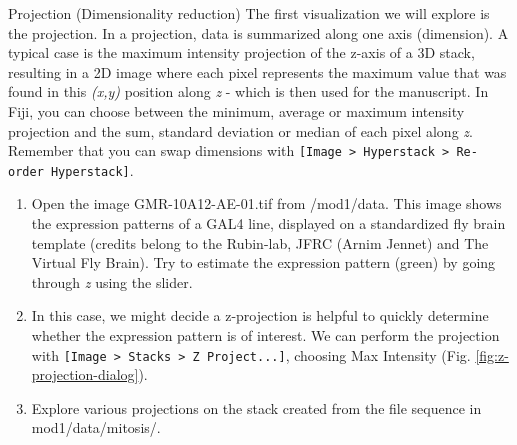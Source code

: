 \begin{taskbox}{Projection (Dimensionality reduction)}
The first visualization we will explore is the projection. In a projection, data is summarized along one axis (dimension). A typical case is the maximum intensity projection of the z-axis of a 3D stack, resulting in a 2D image where each pixel represents the maximum value that was found in this \emph{(x,y)} position along \emph{z} - which is then used for the manuscript. In Fiji, you can choose between the minimum, average or maximum intensity projection and the sum, standard deviation or median of each pixel along \emph{z}. Remember that you can swap dimensions with \texttt{[Image > Hyperstack > Re-order Hyperstack]}.

\begin{enumerate}
	\item Open the image GMR-10A12-AE-01.tif from /mod1/data. This image shows the expression patterns of a GAL4 line, displayed on a standardized fly brain template (credits belong to the Rubin-lab, JFRC (Arnim Jennet) and The Virtual Fly Brain). Try to estimate the expression pattern (green) by going through \emph{z} using the slider. 
	\item In this case, we might decide a z-projection is helpful to quickly determine whether the expression pattern is of interest. We can perform the projection with \texttt{[Image > Stacks > Z Project...]}, choosing Max Intensity (Fig. \ref{fig:z-projection-dialog}).
	
	\begin{minipage}[t]{\linewidth}
		\begin{center}
		\medskip
		\label{fig:z-projection-dialog}
		\end{center}
	\end{minipage}
	
	\item Explore various projections on the stack created from the file sequence in mod1/data/mitosis/.
\end{enumerate}

\end{taskbox}


